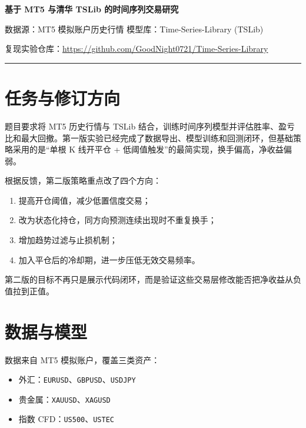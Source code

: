 \documentclass[11pt,a4paper]{ctexart}
\begin{document}
\begin{center}
  {\bfseries 基于 MT5 与清华 TSLib 的时间序列交易研究\par}
  \vspace{0.7em}
  {\small 数据源：MT5 模拟账户历史行情 \quad 模型库：Time-Series-Library (TSLib)\par}
  \vspace{0.25em}
  {\small 复现实验仓库：\url{https://github.com/GoodNight0721/Time-Series-Library}\par}
\end{center}

\vspace{0.6em}
\hrule
\vspace{0.9em}

\section{任务与修订方向}

题目要求将 MT5 历史行情与 TSLib 结合，训练时间序列模型并评估胜率、盈亏比和最大回撤。第一版实验已经完成了数据导出、模型训练和回测闭环，但基础策略采用的是“单根 K 线开平仓 + 低阈值触发”的最简实现，换手偏高，净收益偏弱。

根据反馈，第二版策略重点改了四个方向：
\begin{enumerate}
  \item 提高开仓阈值，减少低置信度交易；
  \item 改为状态化持仓，同方向预测连续出现时不重复换手；
  \item 增加趋势过滤与止损机制；
  \item 加入平仓后的冷却期，进一步压低无效交易频率。
\end{enumerate}

第二版的目标不再只是展示代码闭环，而是验证这些交易层修改能否把净收益从负值拉到正值。

\section{数据与模型}

数据来自 MT5 模拟账户，覆盖三类资产：
\begin{itemize}
  \item 外汇：\texttt{EURUSD}、\texttt{GBPUSD}、\texttt{USDJPY}
  \item 贵金属：\texttt{XAUUSD}、\texttt{XAGUSD}
  \item 指数 CFD：\texttt{US500}、\texttt{USTEC}
\end{itemize}
\end{document}
